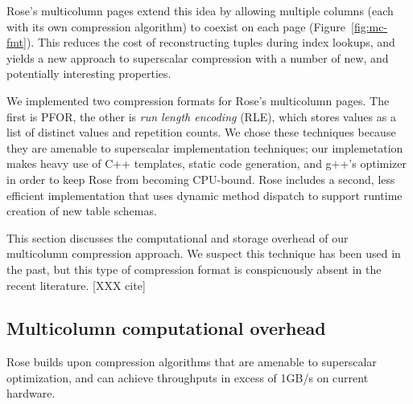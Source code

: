 \documentclass{vldb}
\newcommand{\rows}{Rose\xspace}
\newcommand{\rowss}{Rose's\xspace}
\begin{document}
\rowss multicolumn pages extend this idea by allowing multiple columns
(each with its own compression algorithm) to coexist on each page (Figure~\ref{fig:mc-fmt}).
This reduces the cost of reconstructing tuples during index lookups,
and yields a new approach to superscalar compression with a number of
new, and potentially interesting properties.

We implemented two compression formats for \rowss multicolumn pages.
The first is PFOR, the other is {\em run length encoding} (RLE), which
stores values as a list of distinct values and repetition counts.  We
chose these techniques because they are amenable to superscalar
implementation techniques; our implemetation makes heavy use of C++
templates, static code generation, and g++'s optimizer in order to
keep \rows from becoming CPU-bound.  \rows includes a second, less
efficient implementation that uses dynamic method dispatch to support
runtime creation of new table schemas.

This section discusses the computational and storage overhead of our multicolumn
compression approach.  We suspect this technique has been used in the
past, but this type of compression format is conspicuously absent in
the recent literature. [XXX cite]

\subsection{Multicolumn computational overhead}

\rows builds upon compression algorithms that are amenable to
superscalar optimization, and can achieve throughputs in excess of
1GB/s on current hardware.



\end{document}
